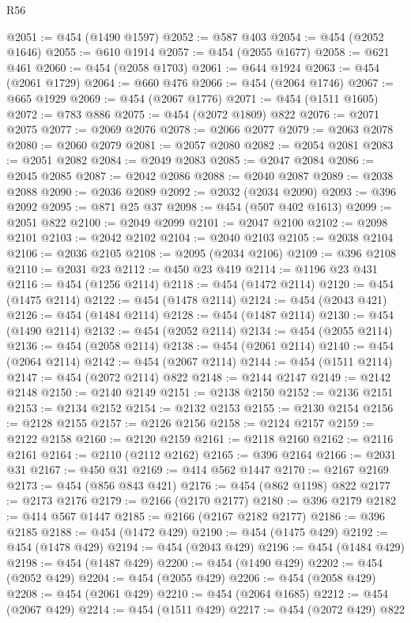 \begin{lexlean}{R56}
\begin{coremodule}
@2051 := @454 (@1490 @1597)
@2052 := @587 @403
@2054 := @454 (@2052 @1646)
@2055 := @610 @1914
@2057 := @454 (@2055 @1677)
@2058 := @621 @461
@2060 := @454 (@2058 @1703)
@2061 := @644 @1924
@2063 := @454 (@2061 @1729)
@2064 := @660 @476
@2066 := @454 (@2064 @1746)
@2067 := @665 @1929
@2069 := @454 (@2067 @1776)
@2071 := @454 (@1511 @1605)
@2072 := @783 @886
@2075 := @454 (@2072 @1809) @822
@2076 := @2071 @2075
@2077 := @2069 @2076
@2078 := @2066 @2077
@2079 := @2063 @2078
@2080 := @2060 @2079
@2081 := @2057 @2080
@2082 := @2054 @2081
@2083 := @2051 @2082
@2084 := @2049 @2083
@2085 := @2047 @2084
@2086 := @2045 @2085
@2087 := @2042 @2086
@2088 := @2040 @2087
@2089 := @2038 @2088
@2090 := @2036 @2089
@2092 := @2032 (@2034 @2090)
@2093 := @396 @2092
@2095 := @871 @25 @37
@2098 := @454 (@507 @402 @1613)
@2099 := @2051 @822
@2100 := @2049 @2099
@2101 := @2047 @2100
@2102 := @2098 @2101
@2103 := @2042 @2102
@2104 := @2040 @2103
@2105 := @2038 @2104
@2106 := @2036 @2105
@2108 := @2095 (@2034 @2106)
@2109 := @396 @2108
@2110 := @2031 @23
@2112 := @450 @23 @419
@2114 := @1196 @23 @431
@2116 := @454 (@1256 @2114)
@2118 := @454 (@1472 @2114)
@2120 := @454 (@1475 @2114)
@2122 := @454 (@1478 @2114)
@2124 := @454 (@2043 @421)
@2126 := @454 (@1484 @2114)
@2128 := @454 (@1487 @2114)
@2130 := @454 (@1490 @2114)
@2132 := @454 (@2052 @2114)
@2134 := @454 (@2055 @2114)
@2136 := @454 (@2058 @2114)
@2138 := @454 (@2061 @2114)
@2140 := @454 (@2064 @2114)
@2142 := @454 (@2067 @2114)
@2144 := @454 (@1511 @2114)
@2147 := @454 (@2072 @2114) @822
@2148 := @2144 @2147
@2149 := @2142 @2148
@2150 := @2140 @2149
@2151 := @2138 @2150
@2152 := @2136 @2151
@2153 := @2134 @2152
@2154 := @2132 @2153
@2155 := @2130 @2154
@2156 := @2128 @2155
@2157 := @2126 @2156
@2158 := @2124 @2157
@2159 := @2122 @2158
@2160 := @2120 @2159
@2161 := @2118 @2160
@2162 := @2116 @2161
@2164 := @2110 (@2112 @2162)
@2165 := @396 @2164
@2166 := @2031 @31
@2167 := @450 @31
@2169 := @414 @562 @1447
@2170 := @2167 @2169
@2173 := @454 (@856 @843 @421)
@2176 := @454 (@862 @1198) @822
@2177 := @2173 @2176
@2179 := @2166 (@2170 @2177)
@2180 := @396 @2179
@2182 := @414 @567 @1447
@2185 := @2166 (@2167 @2182 @2177)
@2186 := @396 @2185
@2188 := @454 (@1472 @429)
@2190 := @454 (@1475 @429)
@2192 := @454 (@1478 @429)
@2194 := @454 (@2043 @429)
@2196 := @454 (@1484 @429)
@2198 := @454 (@1487 @429)
@2200 := @454 (@1490 @429)
@2202 := @454 (@2052 @429)
@2204 := @454 (@2055 @429)
@2206 := @454 (@2058 @429)
@2208 := @454 (@2061 @429)
@2210 := @454 (@2064 @1685)
@2212 := @454 (@2067 @429)
@2214 := @454 (@1511 @429)
@2217 := @454 (@2072 @429) @822

\end{coremodule}
\end{lexlean}
